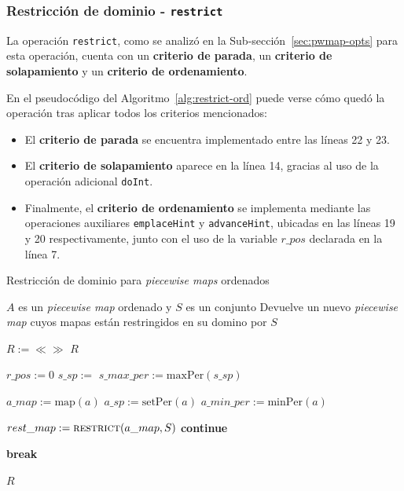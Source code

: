 \subsubsection{Restricción de dominio - \texttt{restrict}}

La operación \texttt{restrict}, como se analizó en la Sub-sección~\ref{sec:pwmap-opts} para esta operación, cuenta con un \textbf{criterio de parada}, un \textbf{criterio de solapamiento} y un \textbf{criterio de ordenamiento}.

En el pseudocódigo del Algoritmo~\ref{alg:restrict-ord} puede verse cómo quedó la operación tras aplicar todos los criterios mencionados:

\begin{itemize}
    \item El \textbf{criterio de parada} se encuentra implementado entre las líneas 22 y 23.
    
    \item El \textbf{criterio de solapamiento} aparece en la línea 14, gracias al uso de la operación adicional \texttt{doInt}.
    
    \item Finalmente, el \textbf{criterio de ordenamiento} se implementa mediante las operaciones auxiliares \texttt{emplaceHint} y \texttt{advanceHint}, ubicadas en las líneas 19 y 20 respectivamente, junto con el uso de la variable $r\_pos$ declarada en la línea 7.
\end{itemize}


\begin{algorithm}
\caption{Restricción de dominio para \textit{piecewise maps} ordenados}
\label{alg:restrict-ord}
\begin{algorithmic}[1]
\Require $A$ es un \textit{piecewise map} ordenado y $S$ es un conjunto
\Ensure Devuelve un nuevo \textit{piecewise map} cuyos mapas están restringidos en su domino por $S$

    \State $R := \ll\gg$
        \State \Return $R$
    \EndIf

    \State $r\_pos := 0$
    \State $s\_sp :=$ 
    \State $s\_max\_per := \mathrm{maxPer}(s\_sp)$

        \State  $a\_map := \mathrm{map}(a)$
        \State  $a\_sp := \mathrm{setPer}(a)$
        \State $a\_min\_per := \mathrm{minPer}(a)$
    

            \State $rest\_map := \Call{restrict}{a\_map,S}$
                \State {}
                \State {}
            \EndIf
            \State \textbf{continue}
        \EndIf

            \State \textbf{break}
        \EndIf

    \EndFor

    \State \Return $R$
\EndFunction
\end{algorithmic}
\end{algorithm}

